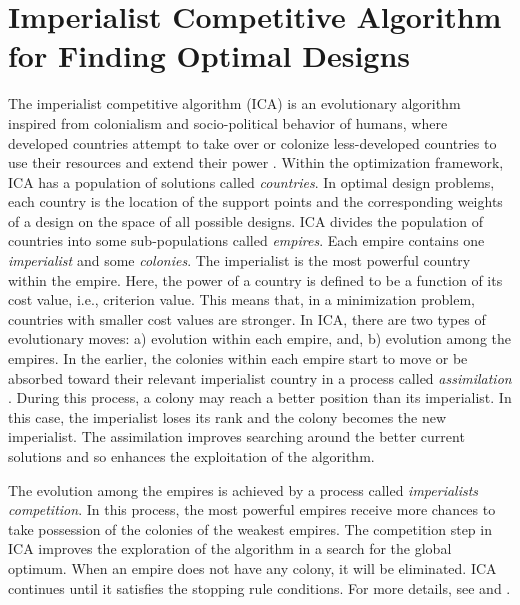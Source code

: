 \section{Imperialist Competitive Algorithm for Finding Optimal Designs}
\label{sec:ICA}
The imperialist competitive algorithm (ICA) is an evolutionary algorithm inspired from colonialism and socio-political behavior of humans, where developed countries attempt to take over or colonize less-developed countries  to use their resources and  extend their power \citep{ica2007}. Within the optimization framework,  ICA has a population of solutions called {\it countries}. In optimal design problems, each country is the location of the  support  points and the corresponding weights of a design on the space of all possible designs.
ICA divides the population of countries into some sub-populations called {\it empires}. Each empire contains one {\it imperialist} and some {\it colonies}.  The imperialist is the most powerful country within the empire. Here,  the power of a country is defined to be a function of its cost value, i.e., criterion value. This means that, in a minimization problem, countries with smaller cost values are stronger.
In ICA, there are two types of evolutionary moves: a) evolution within  each empire, and, b) evolution among the empires.
In the earlier, the colonies within each empire start to move or be absorbed  toward their relevant imperialist country  in a process  called {\it assimilation} \citep{lin2013imperialist}.
During this process, a colony may reach a  better position than its imperialist.  In this case, the imperialist loses its rank and the colony becomes the new imperialist.
The assimilation  improves searching around the better current solutions and so enhances the exploitation of the algorithm.

The evolution among the empires is achieved by a process called  {\it imperialists competition}. In this process, the most powerful empires receive more chances to take  possession of the colonies of the weakest empires. The competition step in ICA improves  the exploration of the algorithm in a search for the global optimum.
When an empire does not have any colony, it will be eliminated.
ICA continues until it satisfies the stopping rule conditions.
For more details, see \citet{ica2007} and \citet{hosseini2014}.


